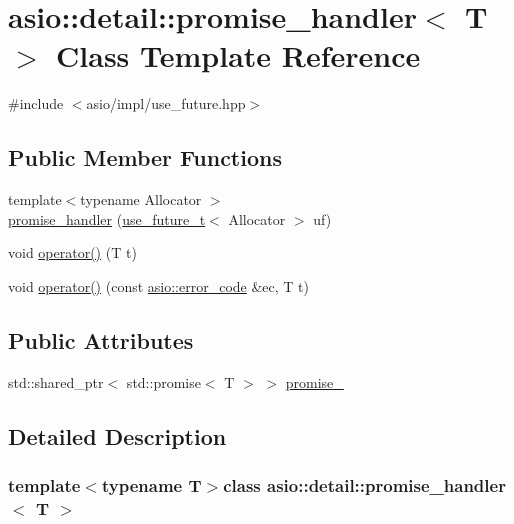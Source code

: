 \hypertarget{classasio_1_1detail_1_1promise__handler}{}\section{asio\+:\+:detail\+:\+:promise\+\_\+handler$<$ T $>$ Class Template Reference}
\label{classasio_1_1detail_1_1promise__handler}


{\ttfamily \#include $<$asio/impl/use\+\_\+future.\+hpp$>$}

\subsection*{Public Member Functions}
\begin{DoxyCompactItemize}
\item 
{\footnotesize template$<$typename Allocator $>$ }\\\hyperlink{classasio_1_1detail_1_1promise__handler_a1b3c5120fe5c917f6ce4ee6beac524e3}{promise\+\_\+handler} (\hyperlink{classasio_1_1use__future__t}{use\+\_\+future\+\_\+t}$<$ Allocator $>$ uf)
\item 
void \hyperlink{classasio_1_1detail_1_1promise__handler_a65feb728ee2cd0d59a599b34a2ac8eff}{operator()} (T t)
\item 
void \hyperlink{classasio_1_1detail_1_1promise__handler_a0ad4f18058eedbf29ca109bf3e36e8d4}{operator()} (const \hyperlink{classasio_1_1error__code}{asio\+::error\+\_\+code} \&ec, T t)
\end{DoxyCompactItemize}
\subsection*{Public Attributes}
\begin{DoxyCompactItemize}
\item 
std\+::shared\+\_\+ptr$<$ std\+::promise$<$ T $>$ $>$ \hyperlink{classasio_1_1detail_1_1promise__handler_a996b0e878a20b28688b682514c62f103}{promise\+\_\+}
\end{DoxyCompactItemize}


\subsection{Detailed Description}
\subsubsection*{template$<$typename T$>$class asio\+::detail\+::promise\+\_\+handler$<$ T $>$}



